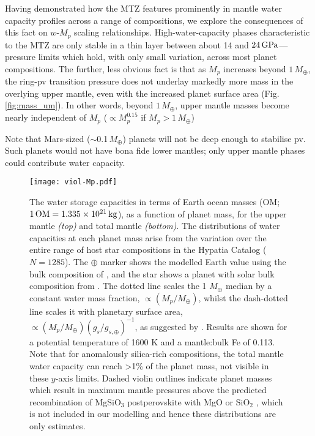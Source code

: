 Having demonstrated how the MTZ features prominently in mantle water capacity profiles across a range of compositions, we explore the consequences of this fact on $w$-$M_p$ scaling relationships. High-water-capacity phases characteristic to the MTZ are only stable in a thin layer between about 14 and $24\,{\rm GPa}$---pressure limits which hold, with only small variation, across most planet compositions. %
The further, less obvious fact is that as $M_p$ increases beyond $1\,M_\oplus$, the ring-pv transition pressure does not underlay markedly more mass in the overlying upper mantle, even with the increased planet surface area (Fig. \ref{fig:mass_um}). In other words, beyond $1\,M_\oplus$, upper mantle masses become nearly independent of $M_p$ ($\propto M_p^{0.15}$ if $M_p > 1 \, M_\oplus$) %

Note that Mars-sized ($\sim$0.1$\,M_\oplus$) planets will not be deep enough to stabilise pv. Such planets would not have bona fide lower mantles; only upper mantle phases could contribute water capacity.



\begin{figure*}
\centering
  \texttt{[image: viol-Mp.pdf]}
\caption[The total mass of water stored in hypothetical planetary mantles, shown as a function of planet mass.]{The water storage capacities in terms of Earth ocean masses (OM; $1\,{\rm OM} = 1.335 \times 10^{21}\, {\rm kg}$), as a function of planet mass, for the upper mantle \textit{(top)} and total mantle \textit{(bottom)}. The distributions of water capacities at each planet mass arise from the variation over the entire range of host star compositions in the Hypatia Catalog ($N = 1285$). The $\oplus$ marker shows the modelled Earth value using the bulk composition of \citet{mcdonough_composition_1995}, and the star shows a planet with solar bulk composition from \citet{lodders_abundances_2009}. The dotted line scales the 1 $M_\oplus$ median by a constant water mass fraction, $\propto (M_p / M_\oplus)$, whilst the dash-dotted line scales it with planetary surface area, $\propto (M_p / M_\oplus) (g_s/g_{s, \oplus})^{-1}$, as suggested by \citet{cowan_water_2014}. Results are shown for a potential temperature of 1600 K and a mantle:bulk Fe of 0.113. Note that for anomalously silica-rich compositions, the total mantle water capacity can reach \textgreater1\% of the planet mass, not visible in these $y$-axis limits. Dashed violin outlines indicate planet masses which result in maximum mantle pressures above the predicted recombination of MgSiO$_3$ postperovskite with MgO or SiO$_2$ \citep{umemoto_phase_2017}, which is not included in our modelling and hence these distributions are only estimates.}
\label{fig:violin_masses}
\end{figure*}



